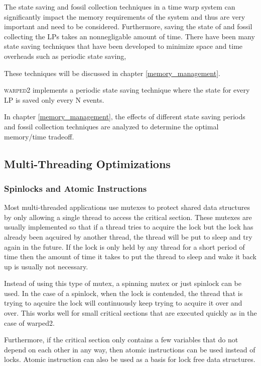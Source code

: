 \documentclass[11pt]{book}
\begin{document}
The state saving and fossil collection techniques in a time warp system can significantly
impact the memory requirements of the system and thus are very important and need to be
considered. Furthermore, saving the state of and fossil collecting the LPs takes an
nonnegligable amount of time. There have been many state saving techniques that have been
developed to minimize space and time overheads such as periodic state saving, 

These techniques will be discussed in chapter \ref{memory_management}.

\textsc{warped2} implements a periodic state saving technique where the state
for every LP is saved only every N events.

In chapter \ref{memory_management}, the effects of different state saving periods and fossil
collection techniques are analyzed to determine the optimal memory/time tradeoff.

\subsection{Multi-Threading Optimizations}

\subsubsection{Spinlocks and Atomic Instructions}

Most multi-threaded applications use mutexes to protect shared data structures by only
allowing a single thread to access the critical section. These mutexes are usually implemented
so that if a thread tries to acquire the lock but the lock has already been aqcuired by
another thread, the thread will be put to sleep and try again in the future. If the lock is
only held by any thread for a short period of time then the amount of time it takes to put
the thread to sleep and wake it back up is usually not necessary.

Instead of using this type of mutex, a spinning mutex or just spinlock can be used. In the
case of a spinlock, when the lock is contended, the thread that is trying to aqcuire the
lock will continuously keep trying to acquire it over and over. This works well for small
critical sections that are executed quickly as in the case of warped2.

Furthermore, if the critical section only contains a few variables that do not depend on
each other in any way, then atomic instructions can be used instead of locks. Atomic
instruction can also be used as a basis for lock free data structures.
\end{document}
